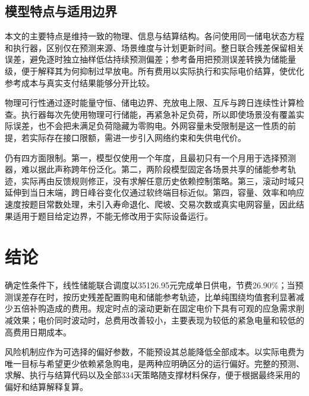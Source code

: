 \subsection{模型特点与适用边界}

本文的主要特点是维持一致的物理、信息与结算结构。各问使用同一储电状态方程和执行器，区别仅在预测来源、场景维度与计划更新时间。整日联合残差保留相关误差，避免逐时独立抽样低估持续预测偏差；参考备用把预测误差转换为储能量级，便于解释其为何抑制过早放电。所有费用以实际执行和实际电价结算，使优化参考成本与真实支付结果能够分开比较。

物理可行性通过逐时能量守恒、储电边界、充放电上限、互斥与跨日连续性计算检查。执行器每次先使用物理可行储能，再紧急补足负荷，所以即使场景没有覆盖实际误差，也不会把未满足负荷隐藏为零购电。外网容量未受限制是这一性质的前提，若实际存在接口限额，需进一步引入网络约束和失供电代价。

仍有四方面限制。第一，模型仅使用一个年度，且最初只有一个月用于选择预测器，难以据此声称跨年份泛化。第二，两阶段模型固定各场景共享的储能参考轨迹，实际再由反馈规则修正，没有求解任意历史依赖控制策略。第三，滚动时域只延伸到当日末端，跨日峰谷变化仅通过软终端目标近似。第四，容量、效率和响应速度按题目常数处理，未引入寿命退化、爬坡、交易次数或真实电网容量，因此结果适用于题目给定边界，不能无修改用于实际设备运行。

\section{结论}

确定性条件下，线性储能联合调度以35126.95元完成单日供电，节费26.90\%；当预测误差存在时，按历史残差配置购电和储能参考轨迹，比单纯围绕均值套利显著减少五倍补购造成的费用。规定时点的滚动更新在固定电价下具有可观的应急需求削减效果；电价同时波动时，总费用改善较小，主要表现为较低的紧急电量和较低的高费用日期成本。

风险机制应作为可选择的偏好参数，不能预设其总能降低全部成本。以实际电费为唯一目标与希望更少依赖紧急购电，是两种应明确区分的运行偏好。完整的预测、求解、执行与结算代码以及全部334天策略随支撑材料保存，便于根据最终采用的偏好和结算解释复算。
